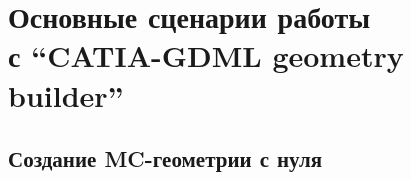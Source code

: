 %                                                                                

\section[Основные сценарии работы с ``CATIA-GDML geometry builder'']{Основные сценарии работы\\ с ``CATIA-GDML geometry builder''}\label{sec:secScenarios}


\subsection{Создание MC-геометрии с нуля}\label{sec:secMCfromScratch}

